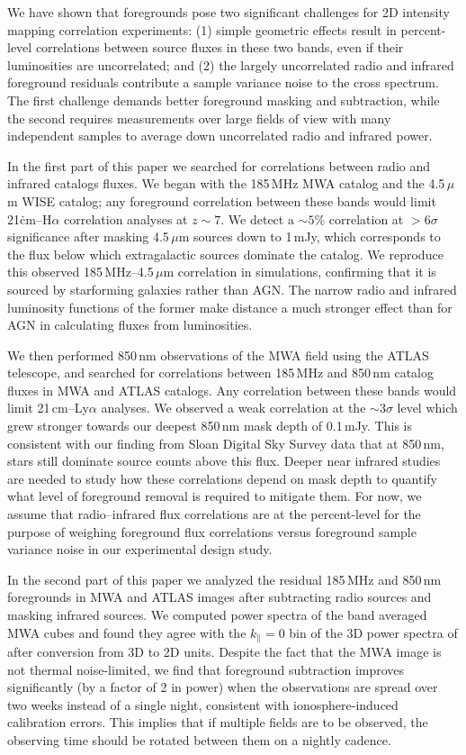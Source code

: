 \documentclass[numberedappendix]{emulateapj}
\begin{document}
We have shown that foregrounds pose two significant challenges for 2D intensity mapping correlation experiments: (1) simple geometric effects result in percent-level correlations between source fluxes in these two bands, even if their luminosities are uncorrelated; and (2) the largely uncorrelated radio and infrared foreground residuals contribute a sample variance noise to the cross spectrum. The first challenge demands better foreground masking and subtraction, while the second requires measurements over large fields of view with many independent samples to average down uncorrelated radio and infrared power.

In the first part of this paper we searched for correlations between radio and infrared catalogs fluxes. We began with the 185\,MHz MWA catalog and the 4.5\,$\mu$m WISE catalog; any foreground correlation between these bands would limit 21\.cm--H$\alpha$ correlation analyses at $z\sim7$. We detect a $\sim5\%$ correlation at $>6\sigma$ significance after masking 4.5\,$\mu$m sources down to 1\,mJy, which corresponds to the flux below which extragalactic sources dominate the catalog. We reproduce this observed 185\,MHz--4.5\,$\mu$m correlation in simulations, confirming that it is sourced by starforming galaxies rather than AGN. The narrow radio and infrared luminosity functions of the former make distance a much stronger effect than for AGN in calculating fluxes from luminosities. 

We then performed 850\,nm observations of the MWA field using the ATLAS telescope, and searched for correlations between 185\,MHz and 850\,nm catalog fluxes in MWA and ATLAS catalogs. Any correlation between these bands would limit 21\,cm--Ly$\alpha$ analyses. We observed a weak correlation at the $\sim3\sigma$ level which grew stronger towards our deepest 850\,nm mask depth of 0.1\,mJy. This is consistent with our finding from Sloan Digital Sky Survey data that at 850\,nm, stars still dominate source counts above this flux. Deeper near infrared studies are needed to study how these correlations depend on mask depth to quantify what level of foreground removal is required to mitigate them. For now, we assume that radio--infrared flux correlations are at the percent-level for the purpose of weighing foreground flux correlations versus  foreground sample variance noise in our experimental design study.

In the second part of this paper we analyzed the residual 185\,MHz and 850\,nm foregrounds in MWA and ATLAS images after subtracting radio sources and masking infrared sources. We computed power spectra of the band averaged MWA cubes and found they agree with the $k_\parallel=0$ bin of the 3D power spectra of \citet{beardsley16} after conversion from 3D to 2D units. Despite the fact that the MWA image is not thermal noise-limited, we find that foreground subtraction improves significantly (by a factor of 2 in power) when the observations are spread over two weeks instead of a single night, consistent with ionosphere-induced calibration errors. This implies that if multiple fields are to be observed, the observing time should be rotated between them on a nightly cadence. 
\end{document}
